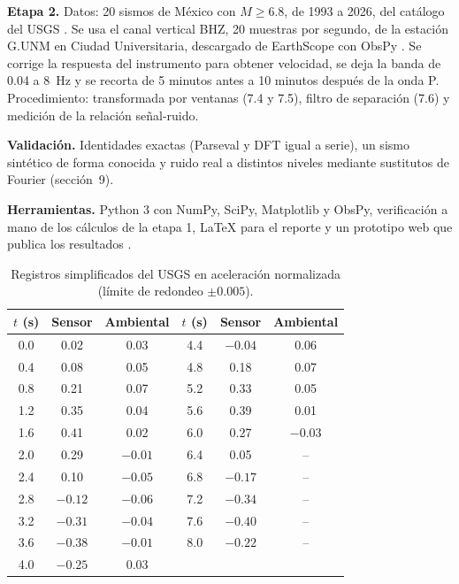 \documentclass[11pt,letterpaper]{article}
\begin{document}
\textbf{Etapa 2.} Datos: 20 sismos de México con $M \geq 6.8$, de 1993 a 2026, del catálogo del USGS \parencite{comcat}. Se usa el canal vertical BHZ, 20 muestras por segundo, de la estación G.UNM en Ciudad Universitaria, descargado de EarthScope \parencite{geoscope} con ObsPy \parencite{obspy2010}. Se corrige la respuesta del instrumento para obtener velocidad, se deja la banda de 0.04 a \SI{8}{Hz} y se recorta de 5 minutos antes a 10 minutos después de la onda P. Procedimiento: transformada por ventanas (7.4 y 7.5), filtro de separación (7.6) y medición de la relación señal-ruido.

\textbf{Validación.} Identidades exactas (Parseval y DFT igual a serie), un sismo sintético de forma conocida y ruido real a distintos niveles mediante sustitutos de Fourier \parencite{theiler1992} (sección~9).

\textbf{Herramientas.} Python 3 con NumPy, SciPy, Matplotlib y ObsPy, verificación a mano de los cálculos de la etapa 1, \LaTeX{} para el reporte y un prototipo web que publica los resultados \parencite{prototipo}.

\begin{table}[H]
\centering
\small
\begin{tabular}{ccc@{\hspace{1.2cm}}ccc}
\toprule
$t$ (s) & Sensor & Ambiental & $t$ (s) & Sensor & Ambiental\\
\midrule
0.0 & 0.02 & 0.03 & 4.4 & $-0.04$ & 0.06\\
0.4 & 0.08 & 0.05 & 4.8 & 0.18 & 0.07\\
0.8 & 0.21 & 0.07 & 5.2 & 0.33 & 0.05\\
1.2 & 0.35 & 0.04 & 5.6 & 0.39 & 0.01\\
1.6 & 0.41 & 0.02 & 6.0 & 0.27 & $-0.03$\\
2.0 & 0.29 & $-0.01$ & 6.4 & 0.05 & --\\
2.4 & 0.10 & $-0.05$ & 6.8 & $-0.17$ & --\\
2.8 & $-0.12$ & $-0.06$ & 7.2 & $-0.34$ & --\\
3.2 & $-0.31$ & $-0.04$ & 7.6 & $-0.40$ & --\\
3.6 & $-0.38$ & $-0.01$ & 8.0 & $-0.22$ & --\\
4.0 & $-0.25$ & 0.03 & & & \\
\bottomrule
\end{tabular}
\caption{Registros simplificados del USGS en aceleración normalizada (límite de redondeo $\pm 0.005$).}
\label{tab:datos}
\end{table}
\end{document}
